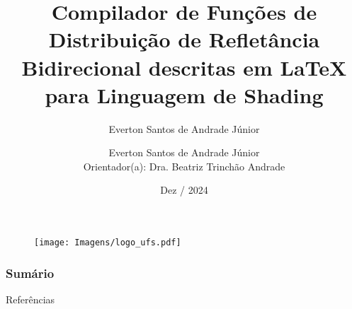 \documentclass[
    9pt,               %
]{beamer}
\title[Compilador de BRDFs]{Compilador de Funções de Distribuição de Refletância Bidirecional descritas em \LaTeX{} para Linguagem de Shading}
\author[]{Everton Santos de Andrade Júnior}
\author[Everton Santos de Andrade Júnior]{Everton Santos de Andrade Júnior \\ \scriptsize{Orientador(a): Dra. Beatriz Trinchão Andrade}}
\institute[UFS]{Universidade Federal de Sergipe}
\date[2024]{Dez / 2024}
\begin{document}
\begin{frame}
    \begin{figure}
        \texttt{[image: Imagens/logo\_ufs.pdf]}
    \end{figure}
    \titlepage
\end{frame}

\begin{frame}
    \frametitle{Sumário}
    \tableofcontents
\end{frame}











\begin{frame}{Referências}
    \printbibliography[heading=none]
\end{frame}


\end{document}
